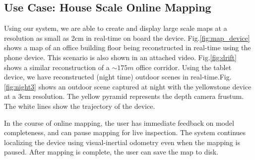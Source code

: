 \documentclass[conference]{IEEEtran}
\newcommand{\figref}[1]{Fig.\ref{#1}}
\begin{document}
%  
%  
\subsection{Use Case: House Scale Online Mapping}
\label{section:mapping}
Using our system, we are able to create and display large scale maps at a
resolution as small as 2cm in real-time on board the device.
\figref{fig:map_device} shows a map of an office building floor being
reconstructed in real-time using the phone device.  This scenario is also shown
in an attached video. \figref{fig:drift} shows a similar reconstruction of a
$\sim 175m$ office corridor. Using the tablet device, we have reconstructed
(night time) outdoor scenes in real-time.\figref{fig:night3} shows an outdoor scene
captured at night with the yellowstone device at a 3cm resolution. The yellow
pyramid represents the depth camera frustum. The white lines show the trajectory
of the device.

In the course of online mapping, the user has immediate feedback on model
completeness, and can pause mapping for live inspection. The system continues
localizing the device using visual-inertial odometry even when the mapping is
paused. After mapping is complete, the user can save the map to disk.
 
\end{document}
